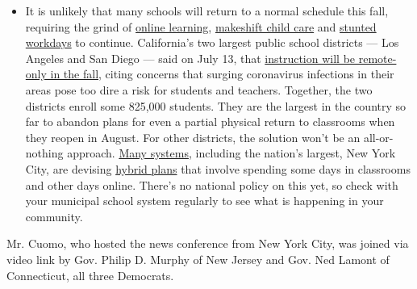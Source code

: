 \begin{itemize}
  \begin{itemize}
  \tightlist
  \item
    It is unlikely that many schools will return to a normal schedule
    this fall, requiring the grind of
    \href{https://www.nytimes3xbfgragh.onion/2020/06/05/us/coronavirus-education-lost-learning.html?action=click\&pgtype=Article\&state=default\&region=MAIN_CONTENT_3\&context=storylines_faq}{online
    learning},
    \href{https://www.nytimes3xbfgragh.onion/2020/05/29/us/coronavirus-child-care-centers.html?action=click\&pgtype=Article\&state=default\&region=MAIN_CONTENT_3\&context=storylines_faq}{makeshift
    child care} and
    \href{https://www.nytimes3xbfgragh.onion/2020/06/03/business/economy/coronavirus-working-women.html?action=click\&pgtype=Article\&state=default\&region=MAIN_CONTENT_3\&context=storylines_faq}{stunted
    workdays} to continue. California's two largest public school
    districts --- Los Angeles and San Diego --- said on July 13, that
    \href{https://www.nytimes3xbfgragh.onion/2020/07/13/us/lausd-san-diego-school-reopening.html?action=click\&pgtype=Article\&state=default\&region=MAIN_CONTENT_3\&context=storylines_faq}{instruction
    will be remote-only in the fall}, citing concerns that surging
    coronavirus infections in their areas pose too dire a risk for
    students and teachers. Together, the two districts enroll some
    825,000 students. They are the largest in the country so far to
    abandon plans for even a partial physical return to classrooms when
    they reopen in August. For other districts, the solution won't be an
    all-or-nothing approach.
    \href{https://bioethics.jhu.edu/research-and-outreach/projects/eschool-initiative/school-policy-tracker/}{Many
    systems}, including the nation's largest, New York City, are
    devising
    \href{https://www.nytimes3xbfgragh.onion/2020/06/26/us/coronavirus-schools-reopen-fall.html?action=click\&pgtype=Article\&state=default\&region=MAIN_CONTENT_3\&context=storylines_faq}{hybrid
    plans} that involve spending some days in classrooms and other days
    online. There's no national policy on this yet, so check with your
    municipal school system regularly to see what is happening in your
    community.
  \end{itemize}
\end{itemize}

Mr. Cuomo, who hosted the news conference from New York City, was joined
via video link by Gov. Philip D. Murphy of New Jersey and Gov. Ned
Lamont of Connecticut, all three Democrats.


